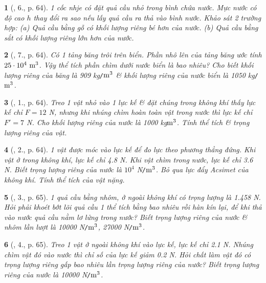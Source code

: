 \documentclass{article}
\newtheorem{baitoan}{}
\begin{document}
\begin{baitoan}[\cite{Van_Quyen_Hanh_Nhu_10_chuyen_Ly}, 6., p. 64]
	1 cốc nhje có đặt quả cầu nhỏ trong bình chứa nước. Mực nước có độ cao $h$ thay đổi ra sao nếu lấy quả cầu ra thả vào bình nước. Khảo sát 2 trường hợp: (a) Quả cầu bằng gỗ có khối lượng riêng bé hơn của nước. (b) Quả cầu bằng sắt có khối lượng riêng lớn hơn của nước.
\end{baitoan}

\begin{baitoan}[\cite{Van_Quyen_Hanh_Nhu_10_chuyen_Ly}, 7., p. 64]
	Có 1 tảng băng trôi trên biển. Phần nhô lên của tảng băng ước tính $25\cdot10^4\ {\rm m}^3$. Vậy thể tích phần chìm dưới nước biển là bao nhiêu? Cho biết khối lượng riêng của băng là {\rm909 kg{\tt/}$\rm m^3$} \& khối lượng riêng của nước biển là {\rm1050 kg{\tt/}$\rm m^3$}.
\end{baitoan}

\begin{baitoan}[\cite{Van_Quyen_Hanh_Nhu_10_chuyen_Ly}, 1., p. 64]
	Treo 1 vật nhỏ vào 1 lực kế \& đặt chúng trong không khí thấy lực kế chỉ $F = 12$ {\rm N}, nhưng khi nhúng chìm hoàn toàn vật trong nước thì lực kế chỉ $F' = 7$ {\rm N}. Cho khối lượng riêng của nước là {\rm1000 kg$\rm m^3$}. Tính thể tích \& trọng lượng riêng của vật.
\end{baitoan}

\begin{baitoan}[\cite{Van_Quyen_Hanh_Nhu_10_chuyen_Ly}, 2., p. 64]
	1 vật được móc vào lực kế để đo lực theo phương thẳng đứng. Khi vật ở trong không khí, lực kế chỉ {\rm4.8 N}. Khi vật chìm trong nước, lực kế chỉ {\rm3.6 N}. Biết trọng lượng riêng của nước là $10^4$ {\rm N{\tt/}$\rm m^3$}. Bỏ qua lực đẩy Acsimet của không khí. Tính thể tích của vật nặng.
\end{baitoan}

\begin{baitoan}[\cite{Van_Quyen_Hanh_Nhu_10_chuyen_Ly}, 3., p. 65]
	1 quả cầu bằng nhôm, ở ngoài không khí có trọng lượng là {\rm1.458 N}. Hỏi phải khoét bớt lõi quả cầu 1 thể tích bằng bao nhiêu rồi hàn kín lại, để khi thả vào nước quả cầu nằm lơ lửng trong nước? Biết trọng lượng riêng của nước \& nhôm lần lượt là {\rm10000 N{\tt/}$\rm m^3$, 27000 N{\tt/}$\rm m^3$}.
\end{baitoan}

\begin{baitoan}[\cite{Van_Quyen_Hanh_Nhu_10_chuyen_Ly}, 4., p. 65]
	Treo 1 vật ở ngoài không khí vào lực kế, lực kế chỉ {\rm2.1 N}. Nhúng chìm vật đó vào nước thì chỉ số của lực kế giảm {\rm0.2 N}. Hỏi chất làm vật đó có trọng lượng riêng gấp bao nhiêu lần trọng lượng riêng của nước? Biết trọng lượng riêng của nước là {\rm10000 N{\tt/}$\rm m^3$}.
\end{baitoan}
\end{document}
